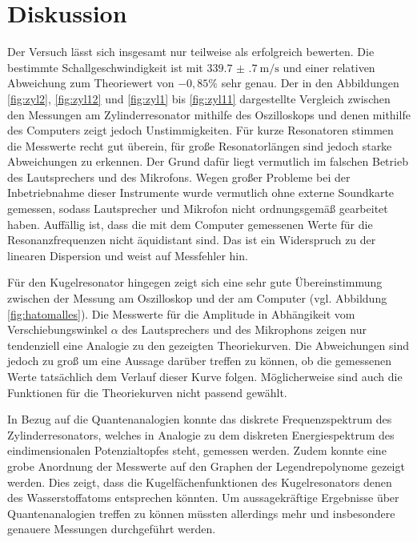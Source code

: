 \section{Diskussion}
\label{sec:Diskussion}

Der Versuch lässt sich insgesamt nur teilweise als erfolgreich bewerten. Die bestimmte
Schallgeschwindigkeit ist mit $\SI{339.7(7)}{\meter\per\second}$ und einer relativen Abweichung zum Theoriewert
von $-0{,}85\%$ sehr genau.
Der in den Abbildungen \ref{fig:zyl2}, \ref{fig:zyl12} und \ref{fig:zyl1} bis \ref{fig:zyl11}
dargestellte Vergleich zwischen den Messungen am Zylinderresonator mithilfe des Oszilloskops und denen mithilfe des
Computers zeigt jedoch Unstimmigkeiten. Für kurze Resonatoren stimmen die Messwerte recht
gut überein, für große Resonatorlängen sind jedoch starke Abweichungen zu erkennen. Der Grund
dafür liegt vermutlich im falschen Betrieb des Lautsprechers und des Mikrofons. Wegen großer
Probleme bei der Inbetriebnahme dieser Instrumente wurde vermutlich ohne externe Soundkarte
gemessen, sodass Lautsprecher und Mikrofon nicht ordnungsgemäß gearbeitet haben.
Auffällig ist, dass die mit dem Computer gemessenen Werte für die Resonanzfrequenzen
nicht äquidistant sind. Das ist ein Widerspruch zu der linearen Dispersion und weist auf
Messfehler hin.

Für den Kugelresonator hingegen zeigt sich eine sehr gute Übereinstimmung zwischen der Messung
am Oszilloskop und der am Computer (vgl. Abbildung \ref{fig:hatomalles}). Die Messwerte für die
Amplitude in Abhängikeit vom Verschiebungswinkel $\alpha$ des Lautsprechers und des Mikrophons
zeigen nur tendenziell eine Analogie zu den gezeigten Theoriekurven. Die Abweichungen sind
jedoch zu groß um eine Aussage darüber treffen zu können, ob die gemessenen Werte
tatsächlich dem Verlauf dieser Kurve folgen. Möglicherweise sind auch die Funktionen
für die Theoriekurven nicht passend gewählt.

In Bezug auf die Quantenanalogien konnte das diskrete Frequenzspektrum des Zylinderresonators, welches in Analogie zu dem diskreten Energiespektrum des eindimensionalen Potenzialtopfes steht, gemessen werden. Zudem konnte
eine grobe Anordnung der Messwerte auf den Graphen der Legendrepolynome gezeigt werden. Dies zeigt, dass die Kugelfächenfunktionen des Kugelresonators denen des
Wasserstoffatoms entsprechen könnten. Um aussagekräftige Ergebnisse über Quantenanalogien treffen zu können müssten allerdings mehr und insbesondere genauere Messungen durchgeführt werden.
